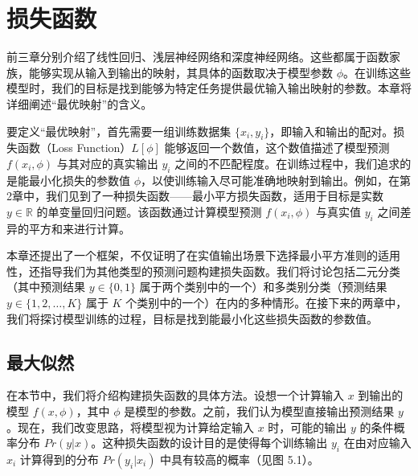 \chapter{损失函数}

前三章分别介绍了线性回归、浅层神经网络和深度神经网络。这些都属于函数家族，能够实现从输入到输出的映射，其具体的函数取决于模型参数 \(\phi\)。在训练这些模型时，我们的目标是找到能够为特定任务提供最优输入输出映射的参数。本章将详细阐述“最优映射”的含义。

要定义“最优映射”，首先需要一组训练数据集 \(\{x_i, y_i\}\)，即输入和输出的配对。损失函数（Loss Function）\(L[\phi]\) 能够返回一个数值，这个数值描述了模型预测 \(f(x_i, \phi)\) 与其对应的真实输出 \(y_i\) 之间的不匹配程度。在训练过程中，我们追求的是能最小化损失的参数值 \(\phi\)，以使训练输入尽可能准确地映射到输出。例如，在第2章中，我们见到了一种损失函数——最小平方损失函数，适用于目标是实数 \(y \in \mathbb{R}\) 的单变量回归问题。该函数通过计算模型预测 \(f(x_i, \phi)\) 与真实值 \(y_i\) 之间差异的平方和来进行计算。

本章还提出了一个框架，不仅证明了在实值输出场景下选择最小平方准则的适用性，还指导我们为其他类型的预测问题构建损失函数。我们将讨论包括二元分类（其中预测结果 \(y \in \{0, 1\}\) 属于两个类别中的一个）和多类别分类（预测结果 \(y \in \{1, 2, \ldots, K\}\) 属于 \(K\) 个类别中的一个）在内的多种情形。在接下来的两章中，我们将探讨模型训练的过程，目标是找到能最小化这些损失函数的参数值。

\section{最大似然}
在本节中，我们将介绍构建损失函数的具体方法。设想一个计算输入 \(x\) 到输出的模型 \(f(x, \phi)\)，其中 \(\phi\) 是模型的参数。之前，我们认为模型直接输出预测结果 \(y\)。现在，我们改变思路，将模型视为计算给定输入 \(x\) 时，可能的输出 \(y\) 的条件概率分布 \(Pr(y|x)\)。这种损失函数的设计目的是使得每个训练输出 \(y_i\) 在由对应输入 \(x_i\) 计算得到的分布 \(Pr(y_i|x_i)\) 中具有较高的概率（见图 5.1）。

